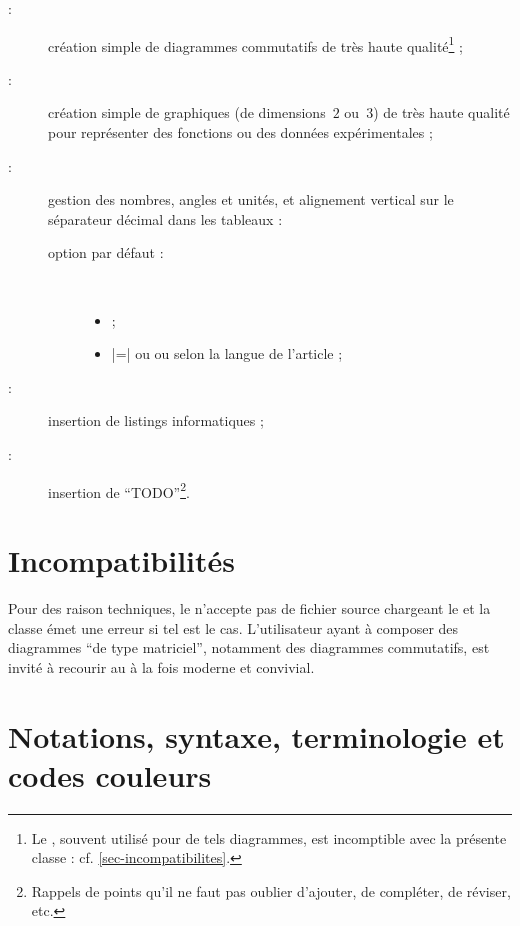 \documentclass[french,nolocaltoc]{nwejmart}
\newtheorem[title=Fait,style=definition]{fact}
\begin{document}
\begin{description}
\item[ :] création simple de diagrammes commutatifs de très
  haute qualité\footnote{Le , souvent utilisé pour de tels
    diagrammes, est incomptible avec la présente classe :
    cf. \vref{sec-incompatibilites}.} ;
\item[ :] création simple de graphiques (de dimensions~$2$
  ou~$3$) de très haute qualité pour représenter des fonctions ou des données
  expérimentales ;
\item[ :] gestion des nombres, angles et unités, et alignement
  vertical sur le séparateur décimal dans les tableaux :
  \begin{description}
  \item[option par défaut :]\
    \begin{itemize}
    \item {} ;
    \item {}|=| ou  ou 
      selon la langue de l'article ;
    \end{itemize}
  \end{description}
\item[ :] insertion de listings informatiques ;
\item[\package{todonotes} :] insertion de \enquote{TODO}\footnote{Rappels de
    points qu'il ne faut pas oublier d'ajouter, de compléter, de réviser, etc.}.
\end{description}

\section{Incompatibilités}
\label{sec-incompatibilites}

Pour des raison techniques, le \nwejm{} n'accepte pas de fichier source
\file{.tex} chargeant le \Package{xy} et la classe \nwejmauthor{} émet une
erreur si tel est le cas. L'utilisateur ayant à composer des diagrammes
\enquote{de type matriciel}, notamment des diagrammes commutatifs, est invité
à recourir au \Package{tikz-cd} à la fois moderne et convivial.

\section{Notations, syntaxe, terminologie et codes couleurs}\label{sec-synt-term-notat}
\end{document}
